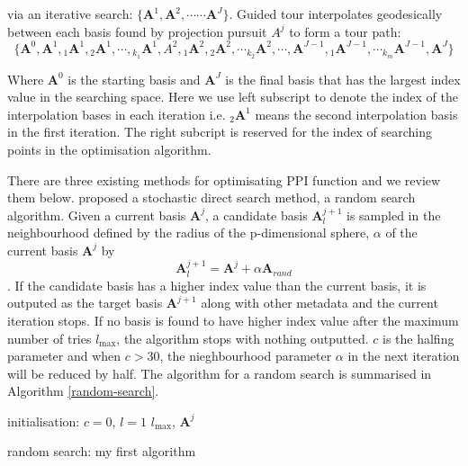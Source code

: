 \documentclass[12pt]{article}
\begin{document}
via an iterative search:
\(\{\mathbf{A}^1, \mathbf{A}^2, \cdots \cdots \mathbf{A}^J\}\). Guided
tour interpolates geodesically between each basis found by projection
pursuit \(A^j\) to form a tour path:
\[\{ \mathbf{A}^0, \mathbf{A}^1, {}_{1}\mathbf{A}^1, {}_{2}\mathbf{A}^1,\cdots, {}_{k_1}\mathbf{A}^1, A^2, {}_{1}\mathbf{A}^2, {}_{2}\mathbf{A}^2, \cdots {}_{k_2}\mathbf{A}^2, \cdots, \mathbf{A}^{J-1}, {}_{1}\mathbf{A}^{J-1}, \cdots {}_{k_m}\mathbf{A}^{J-1} ,\mathbf{A}^J \}\]

Where \(\mathbf{A}^0\) is the starting basis and \(\mathbf{A}^J\) is the
final basis that has the largest index value in the searching space.
Here we use left subscript to denote the index of the interpolation
bases in each iteration i.e. \({}_{2}\mathbf{A}^1\) means the second
interpolation basis in the first iteration. The right subcript is
reserved for the index of searching points in the optimisation
algorithm.

There are three existing methods for optimisating PPI function and we
review them below. \citet{posse1995projection} proposed a stochastic
direct search method, a random search algorithm. Given a current basis
\(\mathbf{A}^{j}\), a candidate basis \(\mathbf{A}^{j +1}_l\) is sampled
in the neighbourhood defined by the radius of the p-dimensional sphere,
\(\alpha\) of the current basis \(\mathbf{A}^{j}\) by
\[\mathbf{A}^{j+1}_{l} = \mathbf{A}^{j} + \alpha \mathbf{A}_{rand}\]. If
the candidate basis has a higher index value than the current basis, it
is outputed as the target basis \(\mathbf{A}^{j + 1}\) along with other
metadata and the current iteration stops. If no basis is found to have
higher index value after the maximum number of tries \(l_{\max}\), the
algorithm stops with nothing outputted. \(c\) is the halfing parameter
and when \(c > 30\), the nieghbourhood parameter \(\alpha\) in the next
iteration will be reduced by half. The algorithm for a random search is
summarised in Algorithm \ref{random-search}.

\newpage
\begin{algorithm}[H]
\SetAlgoLined
  initialisation: $c = 0$, $l = 1$ $l_{\max}$, $\mathbf{A}^{j}$\;
  \caption{random search: my first algorithm}
  \label{random-search}
\end{algorithm}
\end{document}

